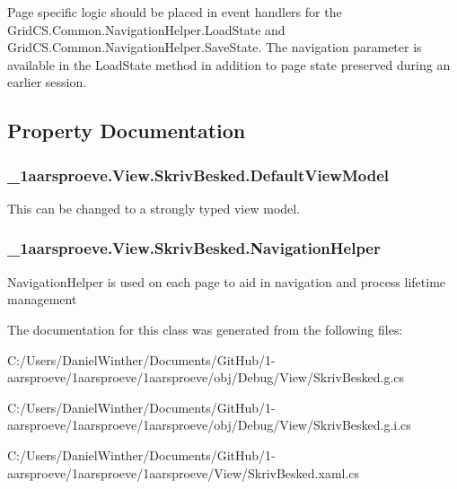 Page specific logic should be placed in event handlers for the Grid\+C\+S.\+Common.\+Navigation\+Helper.\+Load\+State and Grid\+C\+S.\+Common.\+Navigation\+Helper.\+Save\+State. The navigation parameter is available in the Load\+State method in addition to page state preserved during an earlier session. 

\subsection{Property Documentation}
\hypertarget{class__1aarsproeve_1_1_view_1_1_skriv_besked_a32c4fc357cdba1138021e257dd545d53}{}
\subsubsection[{Default\+View\+Model}]{ \+\_\+1aarsproeve.\+View.\+Skriv\+Besked.\+Default\+View\+Model\hspace{0.3cm}{\ttfamily [get]}}\label{class__1aarsproeve_1_1_view_1_1_skriv_besked_a32c4fc357cdba1138021e257dd545d53}


This can be changed to a strongly typed view model. 

\hypertarget{class__1aarsproeve_1_1_view_1_1_skriv_besked_ad24c3da26e1cc62ddf5046f96f170dd7}{}
\subsubsection[{Navigation\+Helper}]{ \+\_\+1aarsproeve.\+View.\+Skriv\+Besked.\+Navigation\+Helper\hspace{0.3cm}{\ttfamily [get]}}\label{class__1aarsproeve_1_1_view_1_1_skriv_besked_ad24c3da26e1cc62ddf5046f96f170dd7}


Navigation\+Helper is used on each page to aid in navigation and process lifetime management 



The documentation for this class was generated from the following files\+:\begin{DoxyCompactItemize}
\item 
C\+:/\+Users/\+Daniel\+Winther/\+Documents/\+Git\+Hub/1-\/aarsproeve/1aarsproeve/1aarsproeve/obj/\+Debug/\+View/Skriv\+Besked.\+g.\+cs\item 
C\+:/\+Users/\+Daniel\+Winther/\+Documents/\+Git\+Hub/1-\/aarsproeve/1aarsproeve/1aarsproeve/obj/\+Debug/\+View/Skriv\+Besked.\+g.\+i.\+cs\item 
C\+:/\+Users/\+Daniel\+Winther/\+Documents/\+Git\+Hub/1-\/aarsproeve/1aarsproeve/1aarsproeve/\+View/Skriv\+Besked.\+xaml.\+cs\end{DoxyCompactItemize}
